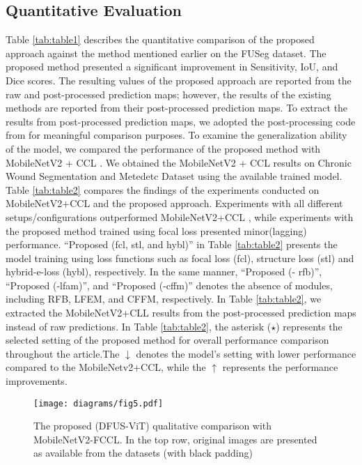 \documentclass[review]{elsarticle}
\begin{document}
\subsection{Quantitative Evaluation}
Table \ref{tab:table1} describes the quantitative comparison of the proposed approach against the method mentioned earlier on the FUSeg dataset. The proposed method presented a significant improvement in Sensitivity, IoU, and Dice scores. The resulting values of the proposed approach are reported from the raw and post-processed prediction maps; however, the results of the existing methods are reported from their post-processed prediction maps. To extract the results from post-processed prediction maps, we adopted the post-processing code from \cite{wang2020fully} for meaningful comparison purposes. To examine the generalization ability of the model, we compared the performance of the proposed method with MobileNetV2 + CCL \cite{wang2020fully}. We obtained the MobileNetV2 + CCL \cite{wang2020fully} results on Chronic Wound Segmentation and Metedetc Dataset using the available trained model. Table \ref{tab:table2} compares the findings of the experiments conducted on MobileNetV2+CCL and the proposed approach. Experiments with all different setups/configurations outperformed MobileNetV2+CCL \cite{wang2020fully}, while experiments with the proposed method trained using focal loss presented minor(lagging) performance. \enquote{Proposed (fcl, stl, and hybl)} in Table \ref{tab:table2} presents the model training using loss functions such as focal loss (fcl), structure loss (stl) and hybrid-e-loss (hybl), respectively. In the same manner, \enquote{Proposed (- rfb)}, \enquote{Proposed (-lfam)}, and \enquote{Proposed (-cffm)} denotes the absence of modules, including RFB, LFEM, and CFFM, respectively. In Table \ref{tab:table2}, we extracted the MobileNetV2+CLL \cite{wang2020fully} results from the post-processed prediction maps instead of raw predictions. In Table \ref{tab:table2}, the asterisk ($\star$) represents the selected setting of the proposed method for overall performance comparison throughout the article.The $\downarrow$ denotes the model's setting with lower performance compared to the MobileNetv2+CCL, while the $\uparrow$ represents the performance improvements.


\begin{figure}[h!]
	\centering
	\texttt{[image: diagrams/fig5.pdf]}
	\caption{The proposed (DFUS-ViT) qualitative comparison with MobileNetV2-FCCL. In the top row, original images are presented as available from the datasets (with black padding) }
	\label{fig:sota}
\end{figure}
\end{document}

